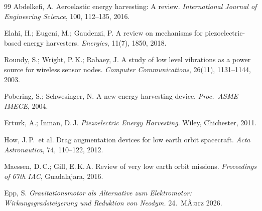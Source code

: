 ﻿\documentclass[12pt, a4paper]{report}
\theoremstyle{definition}
\theoremstyle{remark}
\begin{document}
\begin{thebibliography}{99}
  Abdelkefi, A.
  Aeroelastic energy harvesting: A review.
  \textit{International Journal of Engineering Science}, 100, 112--135, 2016.

  Elahi, H.; Eugeni, M.; Gaudenzi, P.
  A review on mechanisms for piezoelectric-based energy harvesters.
  \textit{Energies}, 11(7), 1850, 2018.

  Roundy, S.; Wright, P.\,K.; Rabaey, J.
  A study of low level vibrations as a power source for wireless sensor nodes.
  \textit{Computer Communications}, 26(11), 1131--1144, 2003.

  Pobering, S.; Schwesinger, N.
  A new energy harvesting device.
  \textit{Proc.\ ASME IMECE}, 2004.

  Erturk, A.; Inman, D.\,J.
  \textit{Piezoelectric Energy Harvesting}.
  Wiley, Chichester, 2011.

  How, J.\,P.\ et al.
  Drag augmentation devices for low earth orbit spacecraft.
  \textit{Acta Astronautica}, 74, 110--122, 2012.

  Maessen, D.\,C.; Gill, E.\,K.\,A.
  Review of very low earth orbit missions.
  \textit{Proceedings of 67th IAC}, Guadalajara, 2016.

  Epp, S.
  \textit{Gravitationsmotor als Alternative zum Elektromotor:
  Wirkungsgradsteigerung und Reduktion von Neodym.}
  24.~MÃ¤rz 2026.

\end{thebibliography}

\end{document}
